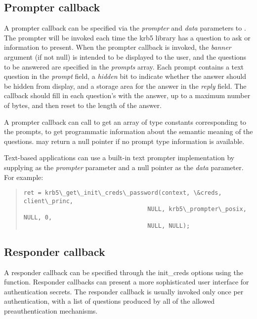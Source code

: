 \documentclass[letterpaper,10pt,english]{sphinxmanual}
\begin{document}
\subsection{Prompter callback}
\label{appdev/init_creds:prompter-callback}
A prompter callback can be specified via the \emph{prompter} and \emph{data}
parameters to {\hyperref[appdev/refs/api/krb5_get_init_creds_password:krb5_get_init_creds_password]{}}.  The prompter
will be invoked each time the krb5 library has a question to ask or
information to present.  When the prompter callback is invoked, the
\emph{banner} argument (if not null) is intended to be displayed to the
user, and the questions to be answered are specified in the \emph{prompts}
array.  Each prompt contains a text question in the \emph{prompt} field, a
\emph{hidden} bit to indicate whether the answer should be hidden from
display, and a storage area for the answer in the \emph{reply} field.  The
callback should fill in each question's  with the
answer, up to a maximum number of  bytes, and then
reset  to the length of the answer.

A prompter callback can call {\hyperref[appdev/refs/api/krb5_get_prompt_types:krb5_get_prompt_types]{}} to get an
array of type constants corresponding to the prompts, to get
programmatic information about the semantic meaning of the questions.
{\hyperref[appdev/refs/api/krb5_get_prompt_types:krb5_get_prompt_types]{}} may return a null pointer if no prompt
type information is available.

Text-based applications can use a built-in text prompter
implementation by supplying {\hyperref[appdev/refs/api/krb5_prompter_posix:krb5_prompter_posix]{}} as the
\emph{prompter} parameter and a null pointer as the \emph{data} parameter.  For
example:
\begin{quote}

\begin{Verbatim}[commandchars=\\\{\}]
ret = krb5\_get\_init\_creds\_password(context, \&creds, client\_princ,
                                   NULL, krb5\_prompter\_posix, NULL, 0,
                                   NULL, NULL);
\end{Verbatim}
\end{quote}


\subsection{Responder callback}
\label{appdev/init_creds:responder-callback}
A responder callback can be specified through the init\_creds options
using the {\hyperref[appdev/refs/api/krb5_get_init_creds_opt_set_responder:krb5_get_init_creds_opt_set_responder]{}} function.
Responder callbacks can present a more sophisticated user interface
for authentication secrets.  The responder callback is usually invoked
only once per authentication, with a list of questions produced by all
of the allowed preauthentication mechanisms.
\end{document}
